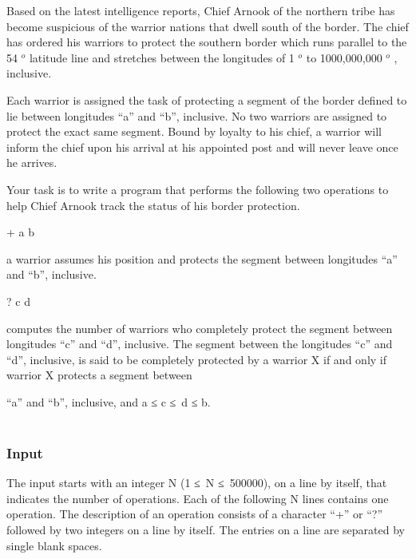 



     Based on the latest intelligence reports, Chief Arnook of the northern tribe has become suspicious of the warrior nations that dwell south of the border. The chief has ordered his warriors to protect the southern border which runs parallel to the 54     $^      o     $     latitude line and stretches between the longitudes of 1     $^      o     $     to 1000,000,000     $^      o     $     , inclusive.    

     Each warrior is assigned the task of protecting a segment of the border defined to lie between longitudes “a” and “b”, inclusive. No two warriors are assigned to protect the exact same segment. Bound by loyalty to his chief, a warrior will inform the chief upon his arrival at his appointed post and will never leave once he arrives.    

         Your task is to write a program that performs the following two operations                   to help Chief Arnook track the status of his border protection.         



        + a b       

        a warrior assumes his position and protects the segment between longitudes “a” and “b”, inclusive.       



        ? c d       

           computes the number of warriors who completely protect the segment between longitudes “c” and “d”, inclusive. The segment between the longitudes “c” and “d”, inclusive, is said to be completely protected by a warrior X if and only if warrior X protects a segment between          

            “a” and “b”, inclusive, and a ≤ c ≤ d ≤ b.            
\\


\\

\subsubsection{\textbf{        Input       }}

    The input starts with an integer N (1 ≤ N ≤ 500000), on a line by itself, that indicates the number of operations. Each of the following N lines contains one operation. The description of an operation consists of a character “+” or “?” followed by two integers on a line by itself. The entries on a line are separated by single blank spaces.   


